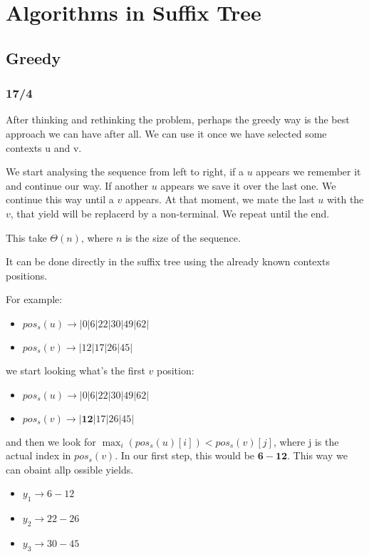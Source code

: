 \section{Algorithms in Suffix Tree}

\subsection{Greedy}
\subsubsection{17/4}

After thinking and rethinking the problem, perhaps the greedy way is the best approach we can have after all. 
We can use it once we have selected some contexts u and v. 

We start analysing the sequence from left to right, if a $u$ appears we remember it and continue our way. If another $u$ appears we save it over the last one. We continue this way until a $v$ appears. At that moment, we mate the last $u$ with the $v$, that yield will be replacerd by a non-terminal. We repeat until the end.

This take $\Theta(n)$, where $n$ is the size of the sequence.

It can be done directly in the suffix tree using the already known contexts positions.

For example: 

\begin{center}
	\begin{itemize}
		\item $pos_s(u)\rightarrow |0|6|22|30|49|62|$
		\item $pos_s(v)\rightarrow |12|17|26|45|$
	\end{itemize}
\end{center}

we start looking what's the first $v$ position:

\begin{center}
	\begin{itemize}
		\item $pos_s(u)\rightarrow |0|6|22|30|49|62|$
		\item $pos_s(v)\rightarrow |\bm{12}|17|26|45|$
	\end{itemize}
\end{center}

and then we look for $\max_i (pos_s(u)[i]) < pos_s(v)[j]$, where j is the actual index in $pos_s(v)$. In our first step, this would be $\bm{6-12}$. 
This way we can obaint allp ossible yields.
\begin{center}
	\begin{itemize}
		\item $y_1 \rightarrow 6-12$
		\item $y_2 \rightarrow 22-26$
		\item $y_3 \rightarrow 30-45$
	\end{itemize}
\end{center}

